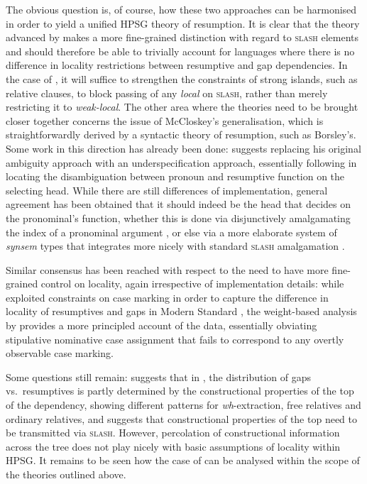 \documentclass[output=paper
,notxmath 
 	        ,biblatex
                ,babelshorthands
                ,newtxmath
                ,draftmode
                ,colorlinks, citecolor=brown
]{langscibook}
\begin{document}
The obvious question is, of course, how these two approaches can be
harmonised in order to yield a unified HPSG theory of resumption.  It
is clear that the theory advanced by \citet{Crysmann:12} makes a more
fine-grained distinction with regard to \textsc{slash} elements and
should therefore be able to trivially account for languages where
there is no difference in locality restrictions between resumptive and
gap dependencies. In the case of , it will suffice to strengthen
the constraints of strong islands, such as relative clauses, to block
passing of any \textit{local} on \textsc{slash}, rather than merely
restricting it to \textit{weak-local}. The other area where the theories
need to be brought closer together concerns the issue of McCloskey's
generalisation, which is straightforwardly derived by a syntactic
theory of resumption, such as Borsley's. Some work in this direction
has already been done: \citet{Crysmann:16} suggests replacing his
original ambiguity approach with an underspecification approach,
essentially following \citet{Borsley.2010} in locating the
disambiguation between pronoun and resumptive function on the
selecting head. While there are still differences of implementation,
general agreement has been obtained that it should indeed be the head
that decides on the pronominal's function, whether this is done via
disjunctively amalgamating the index of a pronominal argument
\citep{Borsley.2010,Alotaibi:Borsley:13}, or else via a more elaborate
system of \textit{synsem} types that integrates more nicely with
standard \textsc{slash} amalgamation \citep{Crysmann:16}.

Similar consensus has been reached with respect to the need to have
more fine-grained control on locality, again irrespective of
implementation details: while \citet{Alotaibi:Borsley:13} exploited
constraints on case marking in order to capture the difference in
locality of resumptives and gaps in Modern Standard , the
weight-based analysis by \citet{Crysmann:17} provides a more
principled account of the data, essentially obviating stipulative
nominative case assignment that fails to correspond to any overtly
observable case marking.

Some questions still remain: \citet[Section~6.5]{Taghvaipour2005a}
suggests that in , the distribution of gaps vs.\ resumptives is
partly determined by the constructional properties of the top of the
dependency, showing different patterns for \emph{wh}-extraction, free
relatives and ordinary relatives, and suggests that constructional
properties of the top need to be transmitted via \textsc{slash}.
However, percolation of constructional information across the tree
does not play nicely with basic assumptions of locality within
HPSG. It remains to be seen how the case of  can be analysed
within the scope of the theories outlined above.
\end{document}
